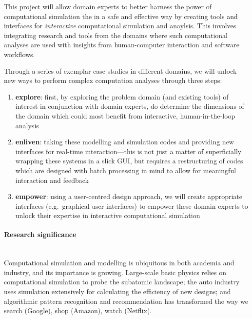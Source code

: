 \documentclass[a4paper,fontsize=12pt]{scrartcl}
\begin{document}

This project will allow domain experts to better harness the power of
computational simulation the in a safe and effective way by creating
tools and interfaces for \emph{interactive} computational simulation
and anaylsis. This involves integrating research and tools from the
domains where such computational analyses are used with insights from
human-computer interaction and software workflows.

Through a series of exemplar case studies in different domains, we
will unlock new ways to perform complex computation analyses through
three steps:

\begin{enumerate}
\item \textbf{explore}: first, by exploring the problem domain (and
  existing tools) of interest in conjunction with domain experts, do
  determine the dimensions of the domain which could most benefit from
  interactive, human-in-the-loop analysis
\item \textbf{enliven}: taking these modelling and simulation codes
  and providing new interfaces for real-time interaction---this is not
  just a matter of superficially wrapping these systems in a slick
  GUI, but requires a restructuring of codes which are designed with
  batch processing in mind to allow for meaningful interaction and
  feedback
\item \textbf{empower}: using a user-centred design approach, we will
  create appropriate interfaces (e.g.~graphical user interfaces) to
  empower these domain experts to unlock their expertise in
  interactive computational simulation
\end{enumerate}

\paragraph*{Research significance}\mbox{}\\


Computational simulation and modelling is ubiquitous in both academia
and industry, and its importance is growing. Large-scale basic physics
relies on computational simulation to probe the subatomic landscape;
the auto industry uses simulation extensively for calculating the
efficiency of new designs; and algorithmic pattern recognition and
recommendation has transformed the way we search (Google), shop
(Amazon), watch (Netflix).
\end{document}
